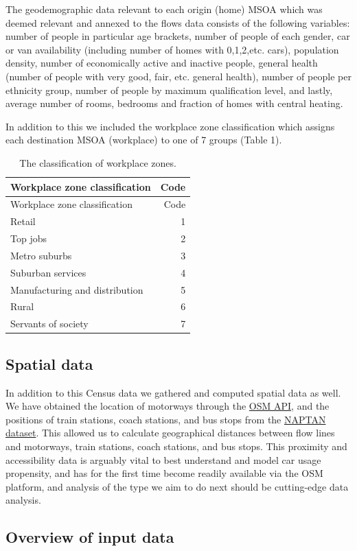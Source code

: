 \documentclass[11pt]{article}
\begin{document}
The geodemographic data relevant to each origin (home) MSOA which was
deemed relevant and annexed to the flows data consists of the following
variables: number of people in particular age brackets, number of people
of each gender, car or van availability (including number of homes with
0,1,2,etc. cars), population density, number of economically active and
inactive people, general health (number of people with very good, fair,
etc. general health), number of people per ethnicity group, number of
people by maximum qualification level, and lastly, average number of
rooms, bedrooms and fraction of homes with central heating.

In addition to this we included the workplace zone classification which
assigns each destination MSOA (workplace) to one of 7 groups (Table 1).

\begin{longtable}[]{@{}lr@{}}
\caption{The classification of workplace zones.}\tabularnewline
\toprule
Workplace zone classification & Code\tabularnewline
\midrule
\endfirsthead
\toprule
Workplace zone classification & Code\tabularnewline
\midrule
\endhead
Retail & 1\tabularnewline
Top jobs & 2\tabularnewline
Metro suburbs & 3\tabularnewline
Suburban services & 4\tabularnewline
Manufacturing and distribution & 5\tabularnewline
Rural & 6\tabularnewline
Servants of society & 7\tabularnewline
\bottomrule
\end{longtable}

\subsection{Spatial data}\label{spatial-data}

In addition to this Census data we gathered and computed spatial data as
well. We have obtained the location of motorways through the
\href{https://osmdatar.github.io/osmdata/articles/osmdata.html}{OSM
API}, and the positions of train stations, coach stations, and bus stops
from the \href{http://naptan.app.dft.gov.uk/datarequest/help}{NAPTAN
dataset}. This allowed us to calculate geographical distances between
flow lines and motorways, train stations, coach stations, and bus stops.
This proximity and accessibility data is arguably vital to best
understand and model car usage propensity, and has for the first time
become readily available via the OSM platform, and analysis of the type
we aim to do next should be cutting-edge data analysis.

\newpage

\subsection{Overview of input data}\label{overview-of-input-data}
\end{document}
